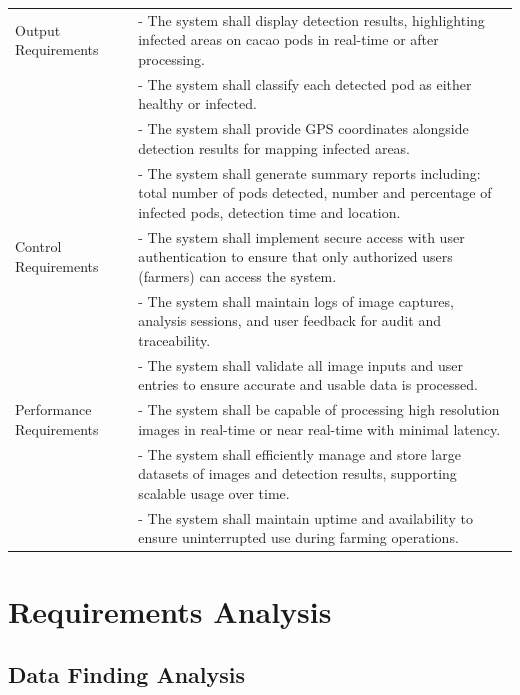 \begin{longtable}{p{4cm} p{8cm}}
	\midrule
	Output Requirements      & - The system shall display detection results, highlighting infected areas on cacao pods in real-time or after processing.                                  \\
	                         & - The system shall classify each detected pod as either healthy or infected.                                                                               \\
	                         & - The system shall provide GPS coordinates alongside detection results for mapping infected areas.                                                         \\
	                         & - The system shall generate summary reports including: total number of pods detected, number and percentage of infected pods, detection time and location. \\
	\midrule
	Control Requirements     & - The system shall implement secure access with user authentication to ensure that only authorized users (farmers) can access the system.                  \\
	                         & - The system shall maintain logs of image captures, analysis sessions, and user feedback for audit and traceability.                                       \\
	                         & - The system shall validate all image inputs and user entries to ensure accurate and usable data is processed.                                             \\
	\midrule
	Performance Requirements & - The system shall be capable of processing high resolution images in real-time or near real-time with minimal latency.                                    \\
	                         & - The system shall efficiently manage and store large datasets of images and detection results, supporting scalable usage over time.                       \\
	                         & - The system shall maintain uptime and availability to ensure uninterrupted use during farming operations.                                                 \\
\end{longtable}

\section{Requirements Analysis}
\subsection{Data Finding Analysis}


